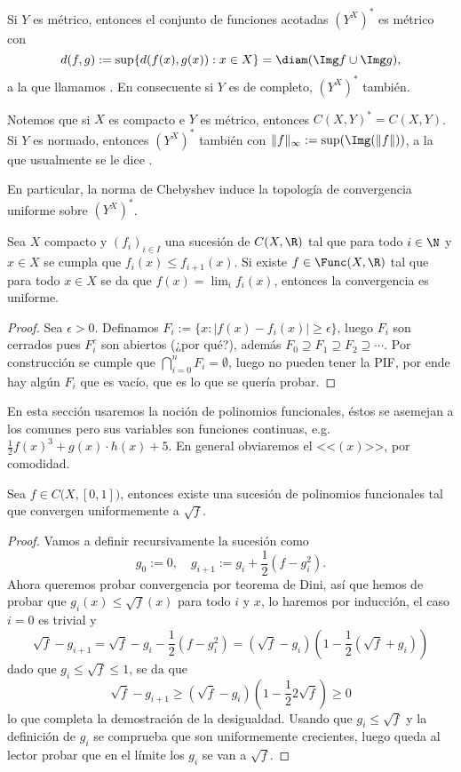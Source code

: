\documentclass[topologia-analisis.tex]{subfiles}
\begin{document}
\begin{prop}
	Si $Y$ es métrico, entonces el conjunto de funciones acotadas $(Y^X)^*$ es métrico con
	$$ d(f,g) := \sup\{ d(f(x), g(x)) : x\in X\} = \diam(\Img f\cup\Img g), $$
	a la que llamamos .
	En consecuente si $Y$ es de completo, $(Y^X)^*$ también.
\end{prop}
Notemos que si $X$ es compacto e $Y$ es métrico, entonces $C(X, Y)^* = C(X, Y)$.
Si $Y$ es normado, entonces $(Y^X)^*$ también con $\|f\|_\infty := \sup( \Img(\|f\|) )$, a la que usualmente se le dice .

En particular, la norma de Chebyshev induce la topología de convergencia uniforme sobre $(Y^X)^*$.

\begin{prop}
	Sea $X$ compacto y $(f_i)_{i\in I}$ una sucesión de $C(X, \R)$ tal que para todo $i\in\N$ y $x\in X$ se cumpla que $f_i(x) \le f_{i+1}(x)$.
	Si existe $f\in\Func(X, \R)$ tal que para todo $x\in X$ se da que $f(x) = \lim_i f_i(x)$, entonces la convergencia es uniforme.
\end{prop}
\begin{proof}
	Sea $\epsilon > 0$.
	Definamos $F_i := \{x : |f(x) - f_i(x)| \ge \epsilon\}$, luego $F_i$ son cerrados pues $F_i^c$ son abiertos (¿por qué?),
	además $F_0 \supseteq F_1 \supseteq F_2 \supseteq \cdots$.
	Por construcción se cumple que $\bigcap_{i=0}^n F_i = \emptyset$, luego no pueden tener la PIF,
	por ende hay algún $F_i$ que es vacío, que es lo que se quería probar.
\end{proof}

En esta sección usaremos la noción de polinomios funcionales, éstos se asemejan a los comunes pero sus variables son funciones continuas,
e.g. $ \frac12 f(x)^3 + g(x)\cdot h(x) + 5 $. En general obviaremos el <<$(x)$>>, por comodidad.

\begin{lem}
	Sea $f \in C\big( X, [0,1] \big)$, entonces existe una sucesión de polinomios funcionales tal que convergen uniformemente a $\sqrt{f}$.
\end{lem}
\begin{proof}
	Vamos a definir recursivamente la sucesión como
	$$ g_0 := 0, \quad g_{i+1} := g_i + \frac{1}{2}(f - g_i^2). $$
	Ahora queremos probar convergencia por teorema de Dini, así que hemos de probar que $g_i(x) \le \sqrt{f}(x)$ para todo $i$ y $x$, lo haremos por inducción, el caso $i = 0$ es trivial y
	$$ \sqrt{f} - g_{i+1} = \sqrt{f} - g_i - \frac{1}{2}(f - g_i^2) = (\sqrt{f} - g_i) \left( 1 - \frac{1}{2}(\sqrt{f} + g_i) \right) $$
	dado que $g_i \le \sqrt{f} \le 1$, se da que
	$$ \sqrt{f} - g_{i+1} \ge (\sqrt{f} - g_i)\left( 1 - \frac{1}{2}2\sqrt{f} \right) \ge 0 $$
	lo que completa la demostración de la desigualdad.
	Usando que $g_i \le \sqrt{f}$ y la definición de $g_i$ se comprueba que son uniformemente crecientes, luego queda al lector probar que en el límite los $g_i$ se van a $\sqrt{f}$.
\end{proof}
\end{document}
